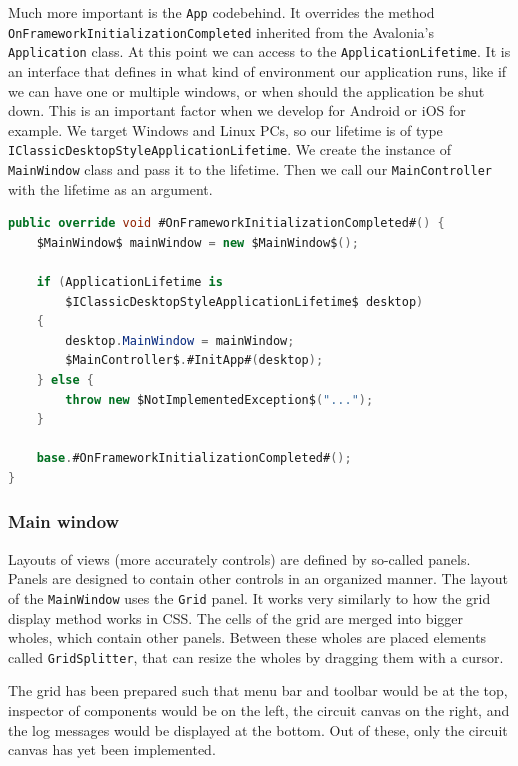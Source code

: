 Much more important is the \texttt{App} codebehind. It  overrides the method \texttt{OnFrameworkInitializationCompleted} inherited from the Avalonia's \texttt{Application} class. At this point we can access to the \texttt{ApplicationLifetime}. It is an interface that defines in what kind of environment our application runs, like if we can have one or multiple windows, or when should the application be shut down. This is an important factor when we develop for Android or iOS for example. We target Windows and Linux PCs, so our lifetime is of type \texttt{IClassicDesktopStyleApplicationLifetime}. We create the instance of \texttt{MainWindow} class and pass it to the lifetime. Then we call our \texttt{MainController} with the lifetime as an argument.

\begin{lstlisting}[language=csharp, caption={\texttt{App.OnFrameworkInitializationCompleted} override}]
public override void #OnFrameworkInitializationCompleted#() {
    $MainWindow$ mainWindow = new $MainWindow$();
    
    if (ApplicationLifetime is 
        $IClassicDesktopStyleApplicationLifetime$ desktop) 
    {
        desktop.MainWindow = mainWindow;
        $MainController$.#InitApp#(desktop);
    } else {
        throw new $NotImplementedException$("...");
    }

    base.#OnFrameworkInitializationCompleted#();
}
\end{lstlisting}

\subsubsection{Main window}

Layouts of views (more accurately controls) are defined by so-called panels. Panels are designed to contain other controls in an organized manner. The layout of the \texttt{MainWindow} uses the \texttt{Grid} panel. It works very similarly to how the grid display method works in CSS. The cells of the grid are merged into bigger wholes, which contain other panels. Between these wholes are placed elements called \texttt{GridSplitter}, that can resize the wholes by dragging them with a cursor.

The grid has been prepared such that menu bar and toolbar would be at the top, inspector of components would be on the left, the circuit canvas on the right, and the log messages would be displayed at the bottom. Out of these, only the circuit canvas has yet been implemented.

